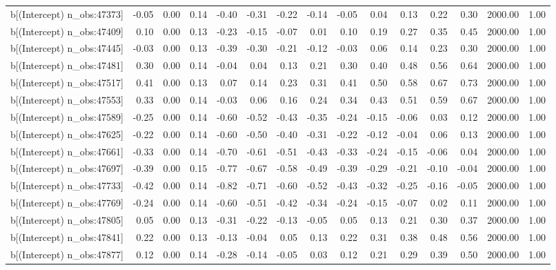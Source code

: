 \begin{table}[ht]
\begin{tabular}{rrrrrrrrrrrrrrr}
  b[(Intercept) n\_obs:47373] & -0.05 & 0.00 & 0.14 & -0.40 & -0.31 & -0.22 & -0.14 & -0.05 & 0.04 & 0.13 & 0.22 & 0.30 & 2000.00 & 1.00 \\ 
  b[(Intercept) n\_obs:47409] & 0.10 & 0.00 & 0.13 & -0.23 & -0.15 & -0.07 & 0.01 & 0.10 & 0.19 & 0.27 & 0.35 & 0.45 & 2000.00 & 1.00 \\ 
  b[(Intercept) n\_obs:47445] & -0.03 & 0.00 & 0.13 & -0.39 & -0.30 & -0.21 & -0.12 & -0.03 & 0.06 & 0.14 & 0.23 & 0.30 & 2000.00 & 1.00 \\ 
  b[(Intercept) n\_obs:47481] & 0.30 & 0.00 & 0.14 & -0.04 & 0.04 & 0.13 & 0.21 & 0.30 & 0.40 & 0.48 & 0.56 & 0.64 & 2000.00 & 1.00 \\ 
  b[(Intercept) n\_obs:47517] & 0.41 & 0.00 & 0.13 & 0.07 & 0.14 & 0.23 & 0.31 & 0.41 & 0.50 & 0.58 & 0.67 & 0.73 & 2000.00 & 1.00 \\ 
  b[(Intercept) n\_obs:47553] & 0.33 & 0.00 & 0.14 & -0.03 & 0.06 & 0.16 & 0.24 & 0.34 & 0.43 & 0.51 & 0.59 & 0.67 & 2000.00 & 1.00 \\ 
  b[(Intercept) n\_obs:47589] & -0.25 & 0.00 & 0.14 & -0.60 & -0.52 & -0.43 & -0.35 & -0.24 & -0.15 & -0.06 & 0.03 & 0.12 & 2000.00 & 1.00 \\ 
  b[(Intercept) n\_obs:47625] & -0.22 & 0.00 & 0.14 & -0.60 & -0.50 & -0.40 & -0.31 & -0.22 & -0.12 & -0.04 & 0.06 & 0.13 & 2000.00 & 1.00 \\ 
  b[(Intercept) n\_obs:47661] & -0.33 & 0.00 & 0.14 & -0.70 & -0.61 & -0.51 & -0.43 & -0.33 & -0.24 & -0.15 & -0.06 & 0.04 & 2000.00 & 1.00 \\ 
  b[(Intercept) n\_obs:47697] & -0.39 & 0.00 & 0.15 & -0.77 & -0.67 & -0.58 & -0.49 & -0.39 & -0.29 & -0.21 & -0.10 & -0.04 & 2000.00 & 1.00 \\ 
  b[(Intercept) n\_obs:47733] & -0.42 & 0.00 & 0.14 & -0.82 & -0.71 & -0.60 & -0.52 & -0.43 & -0.32 & -0.25 & -0.16 & -0.05 & 2000.00 & 1.00 \\ 
  b[(Intercept) n\_obs:47769] & -0.24 & 0.00 & 0.14 & -0.60 & -0.51 & -0.42 & -0.34 & -0.24 & -0.15 & -0.07 & 0.02 & 0.11 & 2000.00 & 1.00 \\ 
  b[(Intercept) n\_obs:47805] & 0.05 & 0.00 & 0.13 & -0.31 & -0.22 & -0.13 & -0.05 & 0.05 & 0.13 & 0.21 & 0.30 & 0.37 & 2000.00 & 1.00 \\ 
  b[(Intercept) n\_obs:47841] & 0.22 & 0.00 & 0.13 & -0.13 & -0.04 & 0.05 & 0.13 & 0.22 & 0.31 & 0.38 & 0.48 & 0.56 & 2000.00 & 1.00 \\ 
  b[(Intercept) n\_obs:47877] & 0.12 & 0.00 & 0.14 & -0.28 & -0.14 & -0.05 & 0.03 & 0.12 & 0.21 & 0.29 & 0.39 & 0.50 & 2000.00 & 1.00 \\ 

\end{tabular}
\end{table}

